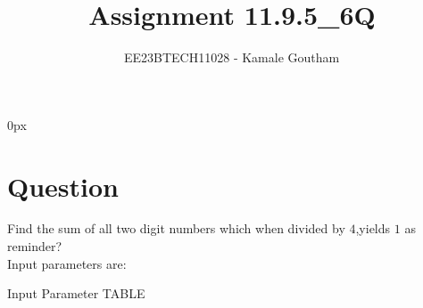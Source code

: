 \documentclass[journal,12pt,twocolumn]{IEEEtran}
\theoremstyle{remark}
\begin{document}
\parindent 0px

\title{Assignment 11.9.5\_6Q}
\author{EE23BTECH11028 - Kamale Goutham$^{}$%
}
\maketitle
\newpage
\bigskip
\section*{Question}
Find the sum of all two digit numbers which when divided by $4$,yields $1$ as reminder?\\
\solution 
Input parameters are:\\
\begin{table}[ht]
    \centering
    \def\arraystretch{1.5}
    
    \caption{Input Parameter TABLE}
    \label{tab:11.9.5.6}
\end{table}
\end{document}
